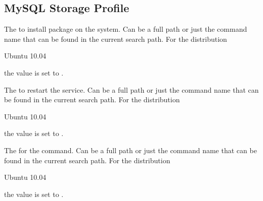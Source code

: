\label{sec:postfix_mysql_profile}
\subsection[Postfix MySQL Profile]{MySQL Storage Profile}


The  to install package on the system. Can be a full path or
just the command name that can be found in the current search path. 
For the distribution
\begin{inparaitem}
\item[\TheDistribution{ubuntu}] Ubuntu 10.04
\end{inparaitem}
the value is set to .


The  to restart the service. Can be a full path or
just the command name that can be found in the current search path. 
For the distribution
\begin{inparaitem}
\item[\TheDistribution{ubuntu}] Ubuntu 10.04
\end{inparaitem}
the value is set to .


The  for the  command. Can be a full path or
just the command name that can be found in the current search path.
For the distribution
\begin{inparaitem}
\item[\TheDistribution{ubuntu}] Ubuntu 10.04
\end{inparaitem}
the value is set to .


